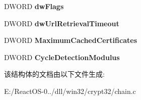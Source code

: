 \begin{DoxyCompactItemize}
D\+W\+O\+RD {\bfseries dw\+Flags}
\item 
\mbox{\label{struct___c_e_r_t___c_h_a_i_n___e_n_g_i_n_e___c_o_n_f_i_g___n_o___e_x_c_l_u_s_i_v_e___r_o_o_t_ad3269dce91094f34c130c4af6c3350b4}} 
D\+W\+O\+RD {\bfseries dw\+Url\+Retrieval\+Timeout}
\item 
\mbox{\label{struct___c_e_r_t___c_h_a_i_n___e_n_g_i_n_e___c_o_n_f_i_g___n_o___e_x_c_l_u_s_i_v_e___r_o_o_t_a1eca2a0790a6bd5b2d44227078571c29}} 
D\+W\+O\+RD {\bfseries Maximum\+Cached\+Certificates}
\item 
\mbox{\label{struct___c_e_r_t___c_h_a_i_n___e_n_g_i_n_e___c_o_n_f_i_g___n_o___e_x_c_l_u_s_i_v_e___r_o_o_t_a62adc4eb88a993e759d3d53fa4113e2a}} 
D\+W\+O\+RD {\bfseries Cycle\+Detection\+Modulus}
\end{DoxyCompactItemize}


该结构体的文档由以下文件生成\+:\begin{DoxyCompactItemize}
\item 
E\+:/\+React\+O\+S-\/0../dll/win32/crypt32/chain.\+c\end{DoxyCompactItemize}
